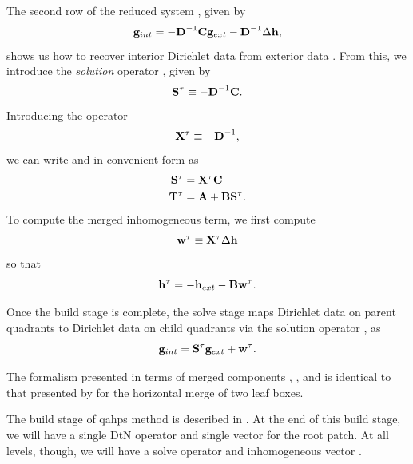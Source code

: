 The second row of the reduced system , given by 
\begin{equation}
\mathbf g_{int} = -\textbf{D}^{-1}\textbf{C} \mathbf g_{ext} -\textbf{D}^{-1} \Delta \mathbf h,
\end{equation}
shows us how to recover interior Dirichlet data \gint  from exterior data \gext.  
From this, we introduce the {\em solution} operator \Stau, given by 
\begin{equation}
\mathbf S^{\tau} \equiv -\textbf{D}^{-1}\textbf{C}.
\label{eq:Stau-merged}
\end{equation}
Introducing  the operator
\begin{equation}
\mathbf X^{\tau} \equiv -\textbf{D}^{-1},
\label{eq:xtau}
\end{equation}
we can write \Ttau and \Stau in convenient form as
\begin{equation}
\begin{aligned}
\mathbf S^{\tau} & = \mathbf X^{\tau} \textbf{C} \\
\mathbf T^{\tau} & = \textbf{A} + \textbf{B}\mathbf S^{\tau}.
\end{aligned}
\end{equation}
To compute the merged inhomogeneous term, we first compute
\begin{equation}
\mathbf w^{\tau} \equiv \mathbf X^{\tau}\Delta \mathbf h
\label{eq:wtau-merged}
\end{equation}
so that
\begin{equation}
\mathbf h^{\tau} = -\mathbf h_{ext} - \textbf{B}\mathbf w^{\tau}.
\label{eq:htau}
\end{equation}

Once the build stage is complete, the solve stage maps Dirichlet data on parent quadrants to Dirichlet data on child quadrants via the solution operator \Stau, as
\begin{equation}
\mathbf g_{int} = \mathbf S^{\tau} \mathbf g_{ext} + \mathbf w^{\tau}.
\label{eq:solve_eqn}
\end{equation}

The formalism presented in terms of merged components \Xtau, \Stau, \Ttau and \htau is identical to that presented by \cite{gillman2014direct} for the horizontal merge of two leaf boxes.

The build stage of \gls{qahps} method is described in . At the end of this build stage, we will have a single DtN operator \Ttau and single vector \htau for the root patch.  At all levels, though, we will have a solve operator \Stau and inhomogeneous vector \wtau.

